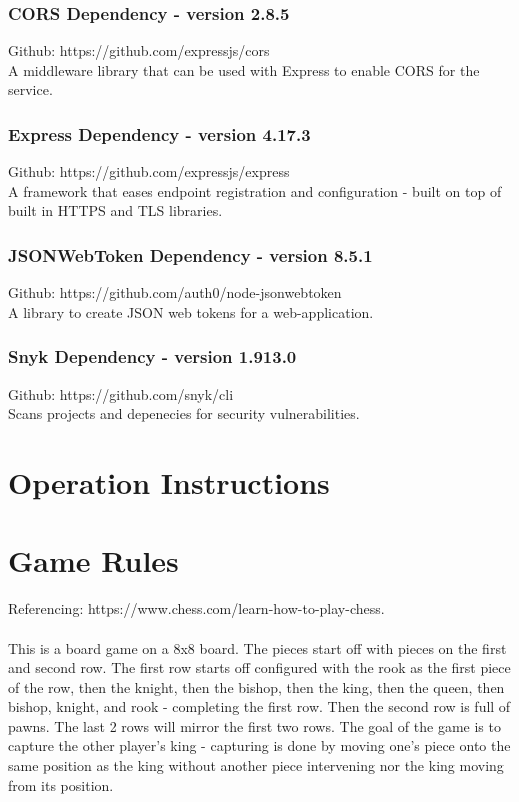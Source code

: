 \documentclass[12pt]{article}
\begin{document}
\subsubsection{CORS Dependency - version 2.8.5}
Github: https://github.com/expressjs/cors\\
A middleware library that can be used with Express to enable CORS for the service.

\subsubsection{Express Dependency - version 4.17.3}
Github: https://github.com/expressjs/express\\
A framework that eases endpoint registration and configuration - built on top of built in HTTPS and TLS libraries.

\subsubsection{JSONWebToken Dependency - version 8.5.1}
Github: https://github.com/auth0/node-jsonwebtoken\\
A library to create JSON web tokens for a web-application.

\subsubsection{Snyk Dependency - version 1.913.0}
Github: https://github.com/snyk/cli\\
Scans projects and depenecies for security vulnerabilities.

\section{Operation Instructions}

\section{Game Rules}
Referencing: https://www.chess.com/learn-how-to-play-chess.\\\\
This is a board game on a 8x8 board. The pieces start off with pieces on the first and second row. The first row starts off configured with the rook as the first piece of the row, then the knight, then the bishop, then the king, then the queen, then bishop, knight, and rook - completing the first row. Then the second row is full of pawns. The last 2 rows will mirror the first two rows. The goal of the game is to capture the other player's king - capturing is done by moving one's piece onto the same position as the king without another piece intervening nor the king moving from its position.
\end{document}
